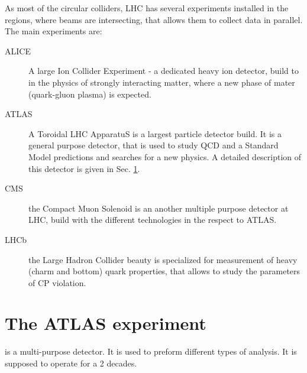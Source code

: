 As most of the circular colliders, LHC has several experiments installed in the regions, where beams are intersecting, that allows them to collect data in parallel. The main experiments are:
\begin{description}
\item [ALICE] A large Ion Collider Experiment\cite{ALICE} - a dedicated heavy ion detector, build to in the physics of strongly interacting matter, where a new phase of mater (quark-gluon plasma) is expected.
\item [ATLAS] A Toroidal LHC ApparatuS\cite{ATLASDetectorPlot} is a largest particle detector build. It is a general purpose detector, that is used to study QCD and a Standard Model predictions and searches for a new physics. A detailed description of this detector is given in Sec. \ref{sec:ATLAS}.
\item [CMS] the Compact Muon\cite{CMS} Solenoid is an another multiple purpose detector at LHC, build with the different technologies in the respect to ATLAS.
\item [LHCb] the Large Hadron Collider\cite{LHCb} beauty is specialized for measurement of heavy (charm and bottom) quark properties, that allows to study the parameters of CP violation.
\end{description}


\begin{figure}[!b]
\end{figure}

\section{The ATLAS experiment} \label{sec:ATLAS}

\begin{figure}[!tbp]
\end{figure}
\atlas is a multi-purpose detector. It is used to preform different types of analysis. It is supposed to operate for a 2 decades. 


